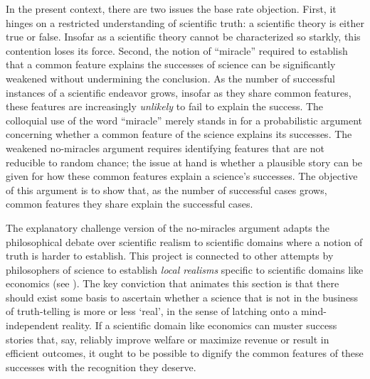 In the present context, there are two issues the base rate objection. First, it hinges on a restricted understanding of scientific truth: a scientific theory is either true or false. Insofar as a scientific theory cannot be characterized so starkly, this contention loses its force. Second, the notion of ``miracle'' required to establish that a common feature explains the successes of science can be significantly weakened without undermining the conclusion. As the number of successful instances of a scientific endeavor grows, insofar as they share common features, these features are increasingly \textit{unlikely} to fail to explain the success. The colloquial use of the word ``miracle'' merely stands in for a probabilistic argument concerning whether a common feature of the science explains its successes. The weakened no-miracles argument requires identifying features that are not reducible to random chance; the issue at hand is whether a plausible story can be given for how these common features explain a science's successes. The objective of this argument is to show that, as the number of successful cases grows, common features they share explain the successful cases.

The explanatory challenge version of the no-miracles argument adapts the philosophical debate over scientific realism to scientific domains where a notion of truth is harder to establish. This project is connected to other attempts by philosophers of science to establish \textit{local realisms} specific to scientific domains like economics (see \cite{maki2009}). The key conviction that animates this section is that there should exist some basis to ascertain whether a science that is not in the business of truth-telling is more or less `real', in the sense of latching onto a mind-independent reality. If a scientific domain like economics can muster success stories that, say, reliably improve welfare or maximize revenue or result in efficient outcomes, it ought to be possible to dignify the common features of these successes with the recognition they deserve. 







    

